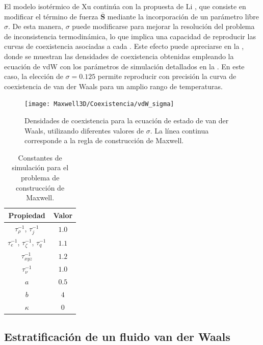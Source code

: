 \FloatBarrier

El modelo isot\'ermico de Xu contin\'ua con la propuesta de Li \cite{li_forcing_2012}, que consiste en modificar el t\'ermino de fuerza $\bar{\bm{S}}$ mediante la incorporaci\'on de un par\'ametro libre $\sigma$. De esta manera, $\sigma$ puede modificarse para mejorar la resoluci\'on del problema de inconsistencia termodin\'amica, lo que implica una capacidad de reproducir las curvas de coexistencia asociadas a cada \eos{}. Este efecto puede apreciarse en la , donde se muestran las densidades de coexistencia obtenidas empleando la ecuaci\'on de vdW con los par\'ametros de simulaci\'on detallados en la . En este caso, la elecci\'on de $\sigma=0.125$ permite reproducir con precisi\'on la curva de coexistencia de van der Waals para un amplio rango de temperaturas.

\begin{figure}[ht]
	\centering
	\texttt{[image: Maxwell3D/Coexistencia/vdW\_sigma]}
	\caption{Densidades de coexistencia para la ecuaci\'on de estado de van der Waals, utilizando diferentes valores de $\sigma$. La l\'inea continua corresponde a la regla de construcci\'on de Maxwell.}
	\label{fig:vdW_coex_3D}
\end{figure}

\begin{table}[ht]
	\centering
    \begin{tabular}{c c}
	    \toprule
        \bf Propiedad & \bf Valor \\
        \midrule
        $\tau_{\rho}^{-1}$, $\tau_{j}^{-1}$ & $1.0$\\
        $\tau_{e}^{-1}$, $\tau_{\zeta}^{-1}$, $\tau_{q}^{-1}$ & $1.1$ \\
        $\tau_{xyz}^{-1}$ & $1.2$ \\        
        $\tau_{\nu}^{-1}$ & $1.0$ \\
		$a$ & $0.5$ \\
		$b$ & $4$ \\        
        $\kappa$ & $0$ \\
        \bottomrule
	\end{tabular}
	\caption{Constantes de simulaci\'on para el problema de construcci\'on de Maxwell.}
	\label{tab:mx3D_prop}
\end{table}  




\subsection{Estratificaci\'on de un fluido van der Waals}

